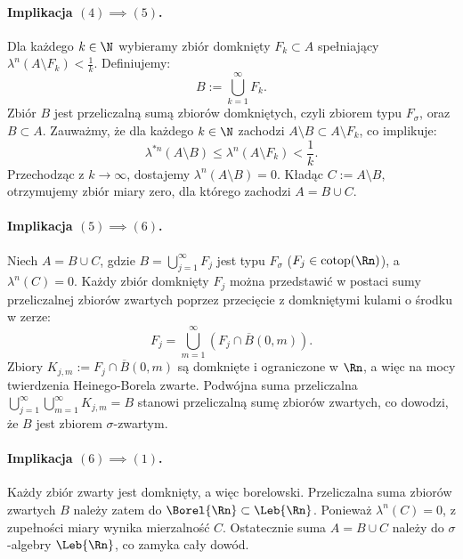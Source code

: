 \begin{dow}
    \paragraph{Implikacja $(4) \implies (5)$.}
    Dla każdego $k \in \N$ wybieramy zbiór domknięty $F_k \subset A$ spełniający $\lambda^n(A \setminus F_k) < \frac{1}{k}$.
    Definiujemy:
    \begin{equation*}
        B := \bigcup_{k=1}^\infty F_k.
    \end{equation*}
    Zbiór $B$ jest przeliczalną sumą zbiorów domkniętych, czyli zbiorem typu $F_\sigma$, oraz $B \subset A$. Zauważmy, że dla każdego $k \in \N$ zachodzi $A \setminus B \subset A \setminus F_k$, co implikuje:
    \begin{equation*}
        \lambda^{*n}(A \setminus B) \le \lambda^n(A \setminus F_k) < \frac{1}{k}.
    \end{equation*}
    Przechodząc z $k \to \infty$, dostajemy $\lambda^n(A \setminus B) = 0$. Kładąc $C := A \setminus B$, otrzymujemy zbiór miary zero, dla którego zachodzi $A = B \cup C$.

    \paragraph{Implikacja $(5) \implies (6)$.}
    Niech $A = B \cup C$, gdzie $B = \bigcup_{j=1}^\infty F_j$ jest typu $F_\sigma$ ($F_j \in \mathrm{cotop}(\Rn)$), a $\lambda^n(C) = 0$.
    Każdy zbiór domknięty $F_j$ można przedstawić w postaci sumy przeliczalnej zbiorów zwartych poprzez przecięcie z domkniętymi kulami o środku w zerze:
    \begin{equation*}
        F_j = \bigcup_{m=1}^\infty \left( F_j \cap \overline{B}(0, m) \right).
    \end{equation*}
    Zbiory $K_{j, m} := F_j \cap \overline{B}(0, m)$ są domknięte i ograniczone w $\Rn$, a więc na mocy twierdzenia Heinego-Borela zwarte. Podwójna suma przeliczalna $\bigcup_{j=1}^\infty \bigcup_{m=1}^\infty K_{j, m} = B$ stanowi przeliczalną sumę zbiorów zwartych, co dowodzi, że $B$ jest zbiorem $\sigma$-zwartym.

    \paragraph{Implikacja $(6) \implies (1)$.}
    Każdy zbiór zwarty jest domknięty, a więc borelowski. Przeliczalna suma zbiorów zwartych $B$ należy zatem do $\Borel{\Rn} \subset \Leb{\Rn}$. Ponieważ $\lambda^n(C) = 0$, z zupełności miary wynika mierzalność $C$. Ostatecznie suma $A = B \cup C$ należy do $\sigma$-algebry $\Leb{\Rn}$, co zamyka cały dowód.
\end{dow}

